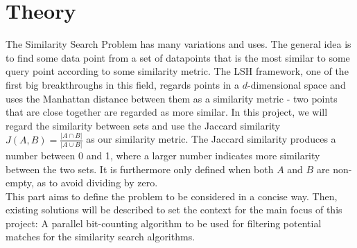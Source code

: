 \section{Theory}
The Similarity Search Problem has many variations and uses. The general idea is to find some data point from a set of datapoints that is the most similar to some query point according to some similarity metric. The LSH framework, one of the first big breakthroughs in this field, regards points in a $d$-dimensional space and uses the Manhattan distance between them as a similarity metric - two points that are close together are regarded as more similar\cite{classic-lsh}. In this project, we will regard the similarity between sets and use the Jaccard similarity $J(A,B)=\frac{|A\cap B|}{|A\cup B|}$ as our similarity metric. The Jaccard similarity produces a number between 0 and 1, where a larger number indicates more similarity between the two sets. It is furthermore only defined when both $A$ and $B$ are non-empty, as to avoid dividing by zero.\\
This part aims to define the problem to be considered in a concise way. Then, existing solutions will be described to set the context for the main focus of this project: A parallel bit-counting algorithm to be used for filtering potential matches for the similarity search algorithms.





